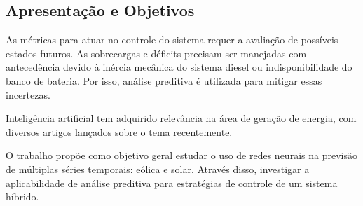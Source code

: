 \subsection{Apresentação e Objetivos}

As métricas para atuar no controle do sistema requer a avaliação de possíveis estados
futuros. As sobrecargas e déficits precisam ser manejadas com antecedência devido à
inércia mecânica do sistema diesel ou indisponibilidade do banco de bateria. Por
isso, análise preditiva é utilizada para mitigar essas incertezas.

Inteligência artificial tem adquirido relevância na área de geração de
energia, com diversos artigos lançados sobre o tema recentemente.

O trabalho propõe como objetivo geral estudar o uso de redes neurais na previsão
de múltiplas séries temporais: eólica e solar. Através disso, investigar
a aplicabilidade de análise preditiva para estratégias de controle de
um sistema híbrido.
